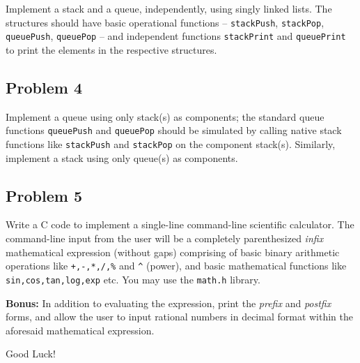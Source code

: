 \documentclass[11pt,a4paper]{article}
\begin{document}
Implement a stack and a queue, independently, using singly linked lists. The structures should have basic operational functions -- \texttt{stackPush}, \texttt{stackPop}, \texttt{queuePush}, \texttt{queuePop} -- and independent functions \texttt{stackPrint} and \texttt{queuePrint} to print the elements in the respective structures.


\subsection*{Problem 4}

Implement a queue using only stack(s) as components; the standard queue functions \texttt{queuePush} and \texttt{queuePop} should be simulated by calling native stack functions like \texttt{stackPush} and \texttt{stackPop} on the component stack(s). Similarly, implement a stack using only queue(s) as components.


\subsection*{Problem 5}

Write a C code to implement a single-line command-line scientific calculator. The command-line input from the user will be a completely parenthesized \emph{infix} mathematical expression (without gaps) comprising of basic binary arithmetic operations like \texttt{+,-,*,/,\%} and \texttt{\^} (power), and basic mathematical functions like \texttt{sin,cos,tan,log,exp} etc. You may use the \texttt{math.h} library.

\textbf{Bonus:} In addition to evaluating the expression, print the \emph{prefix} and \emph{postfix} forms, and allow the user to input rational numbers in decimal format within the aforesaid mathematical expression. 



\vfill

\hfill Good Luck! {\Large\smiley{}}
\end{document}
